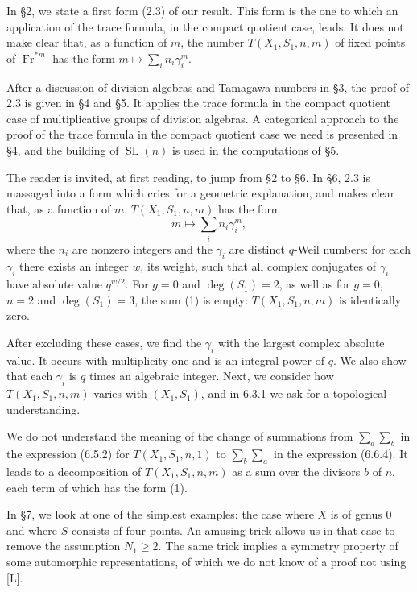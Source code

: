 \documentclass[10pt]{article}
\newcommand{\SL}{\operatorname{SL}}
\newcommand{\Fr}{\operatorname{Fr}}
\theoremstyle{deligne}
\begin{document}
In \S2, we state a first form (2.3) of our result. This form is the one to which an application of the trace formula, in the compact quotient case, leads. It does not make clear that, as a function of $m$, the number $T(X_1,S_1,n,m)$ of fixed points of $\Fr^{*m}$ has the form $m\mapsto\sum_i n_i\gamma_i^m$.

After a discussion of division algebras and Tamagawa numbers in \S3, the proof of 2.3 is given in \S4 and \S5. It applies the trace formula in the compact quotient case of multiplicative groups of division algebras. A categorical approach to the proof of the trace formula in the compact quotient case we need is presented in \S4, and the building of $\SL(n)$ is used in the computations of \S5.

The reader is invited, at first reading, to jump from \S2 to \S6. In \S6, 2.3 is massaged into a form which cries for a geometric explanation, and makes clear that, as a function of $m$, $T(X_1,S_1,n,m)$ has the form
\begin{equation}\tag{1}
 m\longmapsto \sum_i n_i\gamma_i^m,
\end{equation}
where the $n_i$ are nonzero integers and the $\gamma_i$ are distinct $q$-Weil numbers: for each $\gamma_i$ there exists an integer $w$, its weight, such that all complex conjugates of $\gamma_i$ have absolute value $q^{w/2}$. For $g=0$ and $\deg(S_1)=2$, as well as for $g=0$, $n=2$ and $\deg(S_1)=3$, the sum (1) is empty: $T(X_1,S_1,n,m)$ is identically zero.

After excluding these cases, we find the $\gamma_i$ with the largest complex absolute value. It occurs with multiplicity one and is an integral power of $q$. We also show that each $\gamma_i$ is $q$ times an algebraic integer. Next, we consider how $T(X_1,S_1,n,m)$ varies with $(X_1,S_1)$, and in 6.3.1 we ask for a topological understanding.

We do not understand the meaning of the change of summations from $\sum_a\sum_b$ in the expression (6.5.2) for $T(X_1,S_1,n,1)$ to $\sum_b\sum_a$ in the expression (6.6.4). It leads to a decomposition of $T(X_1,S_1,n,m)$ as a sum over the divisors $b$ of $n$, each term of which has the form (1).

In \S7, we look at one of the simplest examples: the case where $X$ is of genus $0$ and where $S$ consists of four points. An amusing trick allows us in that case to remove the assumption $N_1\ge2$. The same trick implies a symmetry property of some automorphic representations, of which we do not know of a proof not using [L].
\end{document}

